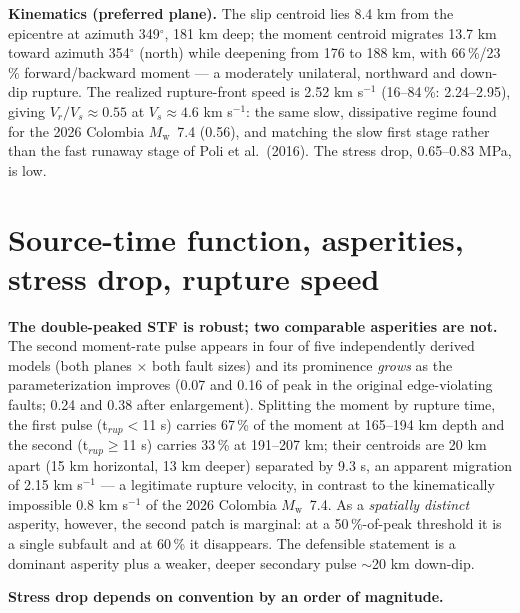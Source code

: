 \documentclass[11pt]{article}
\newcommand{\Mw}{$M_{\mathrm w}$}
\begin{document}
\textbf{Kinematics (preferred plane).} The slip centroid lies 8.4 km from the epicentre at
azimuth 349$^\circ$, 181 km deep; the moment centroid migrates 13.7 km toward azimuth
354$^\circ$ (north) while deepening from 176 to 188 km, with 66\,\%/23\,\% forward/backward
moment --- a moderately unilateral, northward and down-dip rupture. The realized rupture-front
speed is 2.52 km s$^{-1}$ (16--84\,\%: 2.24--2.95), giving $V_r/V_s\approx0.55$ at
$V_s\approx4.6$ km s$^{-1}$: the same slow, dissipative regime found for the 2026 Colombia
\Mw~7.4 (0.56), and matching the slow first stage rather than the fast runaway stage of
Poli et al.\ (2016). The stress drop, 0.65--0.83 MPa, is low.

\section{Source-time function, asperities, stress drop, rupture speed}
\textbf{The double-peaked STF is robust; two comparable asperities are not.} The second
moment-rate pulse appears in four of five independently derived models (both planes $\times$
both fault sizes) and its prominence \emph{grows} as the parameterization improves (0.07 and
0.16 of peak in the original edge-violating faults; 0.24 and 0.38 after enlargement). Splitting
the moment by rupture time, the first pulse (t$_{rup}<$11 s) carries 67\,\% of the moment at
165--194 km depth and the second (t$_{rup}\geq$11 s) carries 33\,\% at 191--207 km; their
centroids are 20 km apart (15 km horizontal, 13 km deeper) separated by 9.3 s, an apparent
migration of 2.15 km s$^{-1}$ --- a legitimate rupture velocity, in contrast to the
kinematically impossible 0.8 km s$^{-1}$ of the 2026 Colombia \Mw~7.4. As a \emph{spatially
distinct} asperity, however, the second patch is marginal: at a 50\,\%-of-peak threshold it is
a single subfault and at 60\,\% it disappears. The defensible statement is a dominant asperity
plus a weaker, deeper secondary pulse $\sim$20 km down-dip.

\textbf{Stress drop depends on convention by an order of magnitude.}
\end{document}
